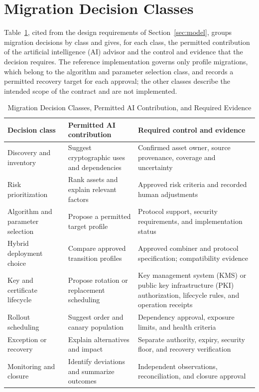 \section{Migration Decision Classes}
\label{s:decisions}
Table~\ref{tab:decisions}, cited from the design requirements of Section~\ref{sec:model}, groups migration decisions by class and gives, for each class, the permitted contribution of the artificial intelligence (AI) advisor and the control and evidence that the decision requires. The reference implementation governs only profile migrations, which belong to the algorithm and parameter selection class, and records a permitted recovery target for each approval; the other classes describe the intended scope of the contract and are not implemented.

\begin{table}[!t]
\caption{Migration Decision Classes, Permitted AI Contribution, and Required Evidence}
\label{tab:decisions}
\centering
\begin{tabular}{>{\raggedright\arraybackslash}p{3.6cm}>{\raggedright\arraybackslash}p{5.4cm}>{\raggedright\arraybackslash}p{6.6cm}}
\toprule
Decision class & Permitted AI contribution & Required control and evidence \\
\midrule
Discovery and inventory & Suggest cryptographic uses and dependencies & Confirmed asset owner, source provenance, coverage and uncertainty \\
Risk prioritization & Rank assets and explain relevant factors & Approved risk criteria and recorded human adjustments \\
Algorithm and parameter selection & Propose a permitted target profile & Protocol support, security requirements, and implementation status \\
Hybrid deployment choice & Compare approved transition profiles & Approved combiner and protocol specification; compatibility evidence \\
Key and certificate lifecycle & Propose rotation or replacement scheduling & Key management system (KMS) or public key infrastructure (PKI) authorization, lifecycle rules, and operation receipts \\
Rollout scheduling & Suggest order and canary population & Dependency approval, exposure limits, and health criteria \\
Exception or recovery & Explain alternatives and impact & Separate authority, expiry, security floor, and recovery verification \\
Monitoring and closure & Identify deviations and summarize outcomes & Independent observations, reconciliation, and closure approval \\
\bottomrule
\end{tabular}
\end{table}

